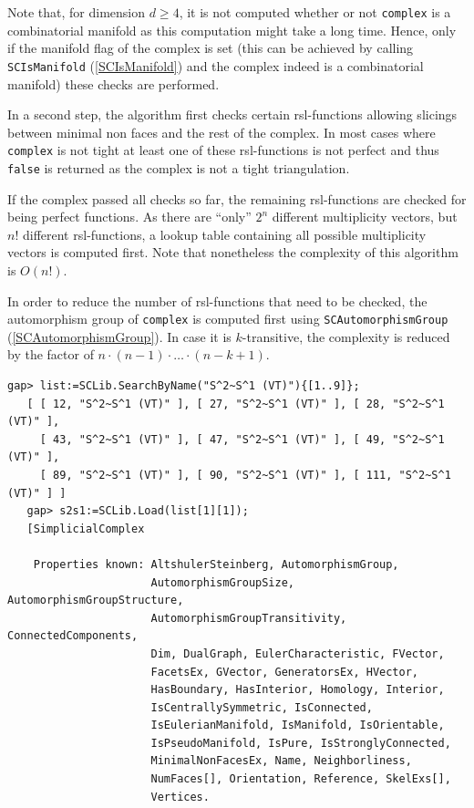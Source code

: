 \documentclass[a4paper,11pt]{report}
\begin{document}
{{{ Note that, for dimension $d \geq 4$, it is not computed whether or not \texttt{complex} is a combinatorial manifold as this computation might take a long time. Hence,
only if the manifold flag of the complex is set (this can be achieved by
calling \texttt{SCIsManifold} (\ref{SCIsManifold}) and the complex indeed is a combinatorial manifold) these checks are
performed.

 In a second step, the algorithm first checks certain rsl-functions allowing
slicings between minimal non faces and the rest of the complex. In most cases
where \texttt{complex} is not tight at least one of these rsl-functions is not perfect and thus \texttt{false} is returned as the complex is not a tight triangulation.

 If the complex passed all checks so far, the remaining rsl-functions are
checked for being perfect functions. As there are ``only'' $2^n$ different multiplicity vectors, but $n!$ different rsl-functions, a lookup table containing all possible multiplicity
vectors is computed first. Note that nonetheless the complexity of this
algorithm is $O(n!)$.

 In order to reduce the number of rsl-functions that need to be checked, the
automorphism group of \texttt{complex} is computed first using \texttt{SCAutomorphismGroup} (\ref{SCAutomorphismGroup}). In case it is $k$-transitive, the complexity is reduced by the factor of $n \cdot (n-1) \cdot \dots \cdot (n-k+1)$. 
\begin{Verbatim}[commandchars=!@|,fontsize=\small,frame=single,label=Example]
   gap> list:=SCLib.SearchByName("S^2~S^1 (VT)"){[1..9]};
   [ [ 12, "S^2~S^1 (VT)" ], [ 27, "S^2~S^1 (VT)" ], [ 28, "S^2~S^1 (VT)" ], 
     [ 43, "S^2~S^1 (VT)" ], [ 47, "S^2~S^1 (VT)" ], [ 49, "S^2~S^1 (VT)" ], 
     [ 89, "S^2~S^1 (VT)" ], [ 90, "S^2~S^1 (VT)" ], [ 111, "S^2~S^1 (VT)" ] ]
   gap> s2s1:=SCLib.Load(list[1][1]);
   [SimplicialComplex
   
    Properties known: AltshulerSteinberg, AutomorphismGroup, 
                      AutomorphismGroupSize, AutomorphismGroupStructure, 
                      AutomorphismGroupTransitivity, ConnectedComponents, 
                      Dim, DualGraph, EulerCharacteristic, FVector, 
                      FacetsEx, GVector, GeneratorsEx, HVector, 
                      HasBoundary, HasInterior, Homology, Interior, 
                      IsCentrallySymmetric, IsConnected, 
                      IsEulerianManifold, IsManifold, IsOrientable, 
                      IsPseudoManifold, IsPure, IsStronglyConnected, 
                      MinimalNonFacesEx, Name, Neighborliness, 
                      NumFaces[], Orientation, Reference, SkelExs[], 
                      Vertices.
   

\end{Verbatim}}}}
\end{document}
